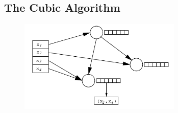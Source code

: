 \subsection{The Cubic Algorithm}
\begin{figure}[H]
	\centering
	\includegraphics[width=220pt]{img/control_flow/cubic_graph}
\end{figure}

